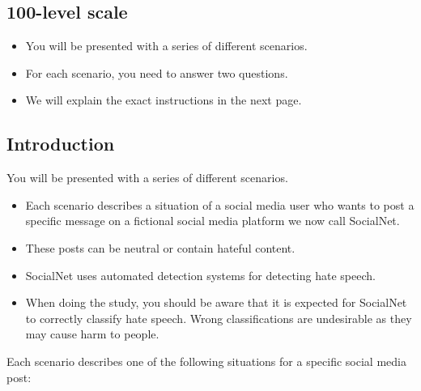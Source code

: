\subsection{100-level scale}
\begin{itemize}
    \item You will be presented with a series of different scenarios.
    \item For each scenario, you need to answer two questions.
    \item We will explain the exact instructions in the next page.
\end{itemize}


\subsection{Introduction}
You will be presented with a series of different scenarios.
\begin{itemize}
    \item Each scenario describes a situation of a social media user who wants to post a specific message on a fictional social media platform we now call SocialNet.
    \item These posts can be neutral or contain hateful content.
    \item SocialNet uses automated detection systems for detecting hate speech.
    \item When doing the study, you should be aware that it is expected for SocialNet to correctly classify hate speech. Wrong classifications are undesirable as they may cause harm to people.
\end{itemize}

\begin{flushleft}
    Each scenario describes one of the following situations for a specific social media post:
\end{flushleft}

